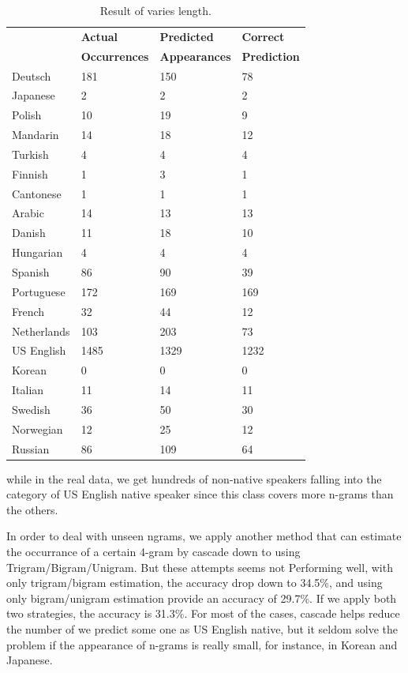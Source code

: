 \documentclass[11pt]{article}
\begin{document}
\begin{table}[h]
\begin{center}
\small\addtolength{\tabcolsep}{-5pt}
\begin{tabular}{|l|l|l|l|}
\hline & \bf Actual & \bf Predicted & \bf Correct \\ 
& \bf Occurrences & \bf Appearances & \bf Prediction \\ \hline
Deutsch & 181 & 150 & 78 \\
Japanese & 2 & 2 & 2 \\
Polish & 10 & 19 & 9 \\
Mandarin & 14 & 18 & 12 \\
Turkish & 4 & 4 & 4 \\
Finnish & 1 & 3 & 1 \\
Cantonese & 1 & 1 & 1 \\
Arabic & 14 & 13 & 13 \\
Danish & 11 & 18 & 10 \\
Hungarian & 4 & 4 & 4 \\
Spanish & 86 & 90 & 39 \\
Portuguese & 172 & 169 & 169 \\
French & 32 & 44 & 12 \\
Netherlands & 103 & 203 & 73 \\
US English & 1485 & 1329 & 1232 \\
Korean & 0 & 0 & 0 \\
Italian & 11 & 14 & 11\\
Swedish & 36 & 50 & 30 \\
Norwegian & 12 & 25 & 12 \\
Russian & 86 & 109 & 64 \\
\hline
\end{tabular}
\end{center}
\caption{\label{font-table} Result of varies length. }
\end{table}


while in the real data, we get hundreds of non-native speakers falling into the category of US English native speaker since this class covers more n-grams than the others.

In order to deal with unseen ngrams, we apply another method that can estimate the occurrance of a certain 4-gram by cascade down to using Trigram/Bigram/Unigram. But these attempts seems not Performing well, with only trigram/bigram estimation, the accuracy drop down to 34.5\%, and using only bigram/unigram estimation provide an accuracy of 29.7\%. If we apply both two strategies, the accuracy is 31.3\%. For most of the cases, cascade helps reduce the number of we predict some one as US English native, but it seldom solve the problem if the appearance of n-grams is really small, for instance, in Korean and Japanese. 
\end{document}
